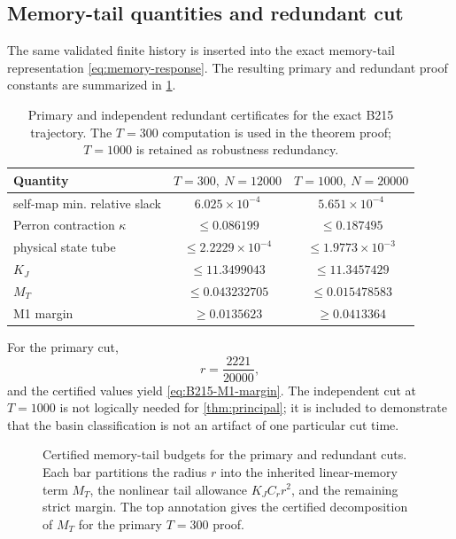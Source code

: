 \subsection{Memory-tail quantities and redundant cut}

The same validated finite history is inserted into the exact memory-tail representation \eqref{eq:memory-response}. The resulting primary and redundant proof constants are summarized in \cref{tab:certificate-summary}.

\begin{table}[t]
\centering
\caption{Primary and independent redundant certificates for the exact B215 trajectory. The \(T=300\) computation is used in the theorem proof; \(T=1000\) is retained as robustness redundancy.}
\label{tab:certificate-summary}
\begin{tabular}{lcc}
\toprule
Quantity & \(T=300,\ N=12000\) & \(T=1000,\ N=20000\)\\
\midrule
self-map min. relative slack
& \(6.025\times10^{-4}\)
& \(5.651\times10^{-4}\)\\
Perron contraction \(\kappa\)
& \(\le0.086199\)
& \(\le0.187495\)\\
physical state tube
& \(\le2.2229\times10^{-4}\)
& \(\le1.9773\times10^{-3}\)\\
\(K_J\)
& \(\le11.3499043\)
& \(\le11.3457429\)\\
\(M_T\)
& \(\le0.043232705\)
& \(\le0.015478583\)\\
M1 margin
& \(\ge0.0135623\)
& \(\ge0.0413364\)\\
\bottomrule
\end{tabular}
\end{table}

For the primary cut,
\[
  r=\frac{2221}{20000},
\]
and the certified values yield \eqref{eq:B215-M1-margin}. The independent cut at \(T=1000\) is not logically needed for \cref{thm:principal}; it is included to demonstrate that the basin classification is not an artifact of one particular cut time.

\begin{figure}[t]
  \centering
  \resizebox{\textwidth}{!}{}
  \caption{Certified memory-tail budgets for the primary and redundant cuts.  Each bar partitions the radius \(r\) into the inherited linear-memory term \(M_T\), the nonlinear tail allowance \(K_JC_rr^2\), and the remaining strict margin.  The top annotation gives the certified decomposition of \(M_T\) for the primary \(T=300\) proof.}
  \label{fig:memory-tail-budget}
\end{figure}

